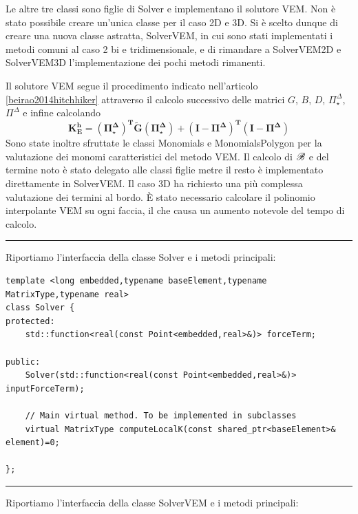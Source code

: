 \documentclass[oneside,12pt]{book}  %
\theoremstyle{plain}
\theoremstyle{definition}
\theoremstyle{remark}
\numberwithin{equation}{chapter} %
\begin{document}
Le altre tre classi sono figlie di Solver e implementano il solutore
VEM. Non \`e stato possibile creare un'unica classe per il caso 2D e
3D. Si \`e scelto dunque di creare una nuova classe astratta,
SolverVEM, in cui sono stati implementati i metodi comuni al caso 2 bi
e tridimensionale, e di rimandare a SolverVEM2D e SolverVEM3D
l'implementazione dei pochi metodi rimanenti. 

Il solutore VEM segue il procedimento indicato nell'articolo
\ref{beirao2014hitchhiker} attraverso il calcolo successivo delle
matrici $G$, $B$, $D$, $\Pi^\Delta_\star$, $\Pi^\Delta$ e infine
calcolando $$ \mathbf{K_E^h= (\Pi^\Delta_\star)^T \tilde{G}
  (\Pi^\Delta_\star)+(I-\Pi^\Delta)^T (I-\Pi^\Delta)} $$ 
Sono state inoltre sfruttate le classi Monomials e MonomialsPolygon
per la valutazione dei monomi caratteristici del metodo VEM. 
Il calcolo di $\mathscr{B}$ e del termine noto \`e stato delegato alle classi
figlie metre il resto \`e implementato direttamente in SolverVEM. Il
caso 3D ha richiesto una pi\`u complessa valutazione dei termini al
bordo. \`E stato necessario calcolare il polinomio interpolante VEM su
ogni faccia, il che causa un aumento notevole del tempo di calcolo.

\noindent\rule{14cm}{1pt}

Riportiamo l'interfaccia della classe Solver e i metodi principali:

\begin{verbatim}
template <long embedded,typename baseElement,typename MatrixType,typename real>
class Solver {
protected:
    std::function<real(const Point<embedded,real>&)> forceTerm;
	
public:
    Solver(std::function<real(const Point<embedded,real>&)> inputForceTerm);

    // Main virtual method. To be implemented in subclasses
    virtual MatrixType computeLocalK(const shared_ptr<baseElement>& element)=0;
	
};

\end{verbatim}

\noindent\rule{14cm}{1pt}

Riportiamo l'interfaccia della classe SolverVEM e i metodi principali:
\end{document}
